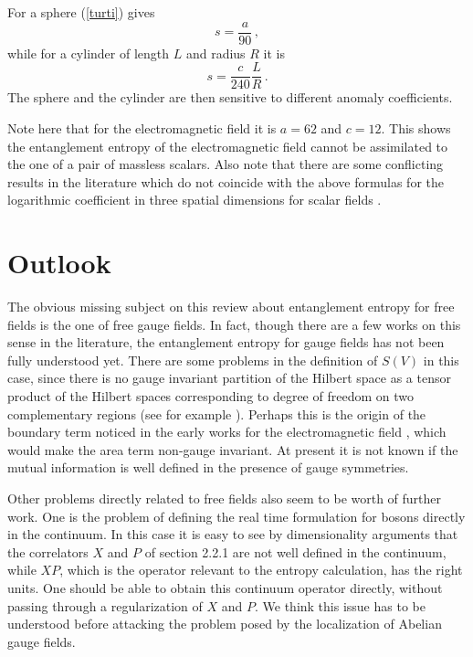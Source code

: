 \documentclass[a4paper]{article}
\begin{document}
For a sphere (\ref{turti}) gives \cite{una}
\begin{equation}
s=\frac{a}{90}  \,,
\end{equation}
while for a cylinder of length $L$ and radius $R$ it is \cite{una}
\begin{equation}
s= \frac{c}{240}\frac{L}{R}\,.
\end{equation}
The sphere and the cylinder are then sensitive to different anomaly coefficients. 

Note here that for the electromagnetic field it is $a=62$ and $c=12$.  This shows the entanglement entropy of the electromagnetic field cannot be assimilated to the one of a pair of massless scalars. Also note that there are some conflicting results in the literature which do not coincide with the above formulas for the logarithmic coefficient in three spatial dimensions for scalar fields \cite{sch}. 


\section{Outlook}
The obvious missing subject on this review about entanglement entropy for free fields is the one of  free gauge fields. In fact, though there are a few works on this sense in the literature, the entanglement entropy for gauge fields has not been fully understood yet. There are some problems in the definition of $S(V)$ in this case, since there is no gauge invariant partition of the Hilbert space as a tensor product of the Hilbert spaces corresponding to degree of freedom on two complementary regions (see for example \cite{gauge}). Perhaps this is the origin of the boundary term noticed in the early works for the electromagnetic field \cite{Kabat}, which would make the area term non-gauge invariant. At present it is not known if the mutual information is well defined in the presence of gauge symmetries. 

Other problems directly related to free fields also seem to be worth of further work. One is the problem of defining the real time formulation for bosons directly in the continuum. In this case it is easy to see by dimensionality arguments that the correlators $X$ and $P$ of section 2.2.1 are not well defined in the continuum, while $XP$, which is the operator relevant to the entropy calculation, has the right units. One should be able to obtain this continuum operator directly, without passing through a regularization of $X$ and $P$. We think this issue has to be understood before attacking the problem posed by the localization of Abelian gauge fields. 
\end{document}

